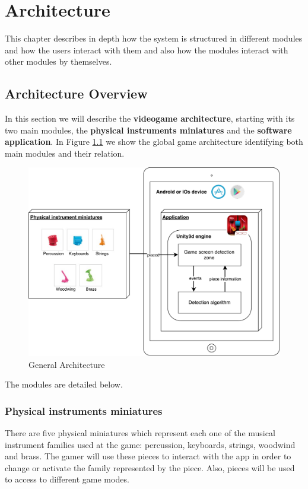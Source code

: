 \chapter{Architecture}
\label{chap:architecture}


\begin{chapterintro}
This chapter describes in depth how the system is structured in different modules and how the users interact with them and also how the modules interact with other modules by themselves.
\end{chapterintro}

\cleardoublepage
\section{Architecture Overview}
In this section we will describe the \textbf{videogame architecture}, starting with its two main modules, the \textbf{physical instruments miniatures} and the \textbf{software application}. In Figure \ref{fig:ArchitectureGeneral} we show the global game architecture identifying both main modules and their relation.

\begin{figure}[ht!]
	\centering
	\includegraphics[width=400pt]{graphics/architecture/ArchitectureGeneral.pdf}
	\caption{General Architecture}
	\label{fig:ArchitectureGeneral}
\end{figure}

\FloatBarrier

The modules are detailed below.

\subsection{Physical instruments miniatures}
There are five physical miniatures which represent each one of the musical instrument families used at the game: percussion, keyboards, strings, woodwind and brass. The gamer will use these pieces to interact with the app in order to change or activate the family represented by the piece. Also, pieces will be used to access to different game modes.

